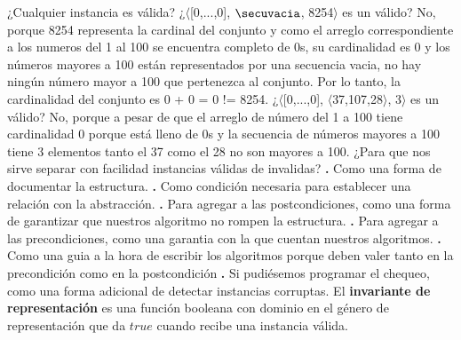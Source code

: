 \documentclass[10pt,a4paper]{article}
\begin{document}
¿Cualquier instancia es válida?
\newline
\newline
¿$\langle$[0,...,0], $\secuvacia$, 8254$\rangle$ es un  válido? No, porque 8254 representa la cardinal del conjunto y como el arreglo correspondiente a los numeros del 1 al 100 se encuentra completo de 0s, su cardinalidad es 0 y los números mayores a 100 están representados por una secuencia vacia, no hay ningún número mayor a 100 que pertenezca al conjunto. Por lo tanto, la cardinalidad del conjunto es 0 + 0 = 0 != 8254.
\newline
\newline
¿$\langle$[0,...,0], $\langle$37,107,28$\rangle$, 3$\rangle$ es un  válido? No, porque a pesar de que el arreglo de número del 1 a 100 tiene cardinalidad 0 porque está lleno de 0s y la secuencia de números mayores a 100 tiene 3 elementos tanto el 37 como el 28 no son mayores a 100.
\newpage
¿Para que nos sirve separar con facilidad instancias válidas de invalidas?
\newline
\newline
\textbf{.} Como una forma de documentar la estructura.
\newline
\newline
\textbf{.} Como condición necesaria para establecer una relación con la abstracción.
\newline
\newline
\textbf{.} Para agregar a las postcondiciones, como una forma de garantizar que nuestros algoritmo no rompen la estructura.
\newline
\newline
\textbf{.} Para agregar a las precondiciones, como una garantia con la que cuentan nuestros algoritmos.
\newline
\newline
\textbf{.} Como una guia a la hora de escribir los algoritmos porque deben valer tanto en la precondición como en la postcondición
\newline
\newline
\textbf{.} Si pudiésemos programar el chequeo, como una forma adicional de detectar instancias corruptas.
\newline
\newline
El \textbf{invariante de representación} es una función booleana con dominio en el género de representación que da $true$ cuando recibe una instancia válida.
\newline
\newline
\end{document}
